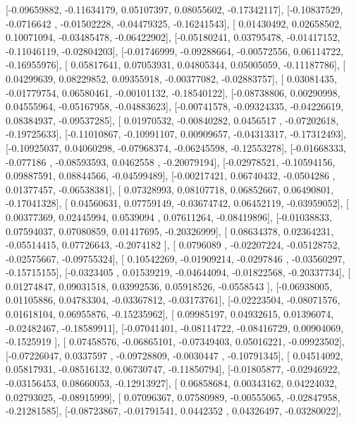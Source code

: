 \documentclass{article}
\begin{document}
       [-0.09659882, -0.11634179,  0.05107397,  0.08055602, -0.17342117],
       [-0.10837529, -0.0716642 , -0.01502228, -0.04479325, -0.16241543],
       [ 0.01430492,  0.02658502,  0.10071094, -0.03485478, -0.06422902],
       [-0.05180241,  0.03795478, -0.01417152, -0.11046119, -0.02804203],
       [-0.01746999, -0.09288664, -0.00572556,  0.06114722, -0.16955976],
       [ 0.05817641,  0.07053931,  0.04805344,  0.05005059, -0.11187786],
       [ 0.04299639,  0.08229852,  0.09355918, -0.00377082, -0.02883757],
       [ 0.03081435, -0.01779754,  0.06580461, -0.00101132, -0.18540122],
       [-0.08738806,  0.00290998,  0.04555964, -0.05167958, -0.04883623],
       [-0.00741578, -0.09324335, -0.04226619,  0.08384937, -0.09537285],
       [ 0.01970532, -0.00840282,  0.0456517 , -0.07202618, -0.19725633],
       [-0.11010867, -0.10991107,  0.00909657, -0.04313317, -0.17312493],
       [-0.10925037,  0.04060298, -0.07968374, -0.06245598, -0.12553278],
       [-0.01668333, -0.077186  , -0.08593593,  0.0462558 , -0.20079194],
       [-0.02978521, -0.10594156,  0.09887591,  0.08844566, -0.04599489],
       [-0.00217421,  0.06740432, -0.0504286 ,  0.01377457, -0.06538381],
       [ 0.07328993,  0.08107718,  0.06852667,  0.06490801, -0.17041328],
       [ 0.04560631,  0.07759149, -0.03674742,  0.06452119, -0.03959052],
       [ 0.00377369,  0.02445994,  0.0539094 ,  0.07611264, -0.08419896],
       [-0.01038833,  0.07594037,  0.07080859,  0.01417695, -0.20326999],
       [ 0.08634378,  0.02364231, -0.05514415,  0.07726643, -0.2074182 ],
       [ 0.0796089 , -0.02207224, -0.05128752, -0.02575667, -0.09755324],
       [ 0.10542269, -0.01909214, -0.0297846 , -0.03560297, -0.15715155],
       [-0.0323405 ,  0.01539219, -0.04644094, -0.01822568, -0.20337734],
       [ 0.01274847,  0.09031518,  0.03992536,  0.05918526, -0.0558543 ],
       [-0.06938005,  0.01105886,  0.04783304, -0.03367812, -0.03173761],
       [-0.02223504, -0.08071576,  0.01618104,  0.06955876, -0.15235962],
       [ 0.09985197,  0.04932615,  0.01396074, -0.02482467, -0.18589911],
       [-0.07041401, -0.08114722, -0.08416729,  0.00904069, -0.1525919 ],
       [ 0.07458576, -0.06865101, -0.07349403,  0.05016221, -0.09923502],
       [-0.07226047,  0.0337597 , -0.09728809, -0.0030447 , -0.10791345],
       [ 0.04514092,  0.05817931, -0.08516132,  0.06730747, -0.11850794],
       [-0.01805877, -0.02946922, -0.03156453,  0.08660053, -0.12913927],
       [ 0.06858684,  0.00343162,  0.04224032,  0.02793025, -0.08915999],
       [ 0.07096367,  0.07580989, -0.00555065, -0.02847958, -0.21281585],
       [-0.08723867, -0.01791541,  0.0442352 ,  0.04326497, -0.03280022],
\end{document}

